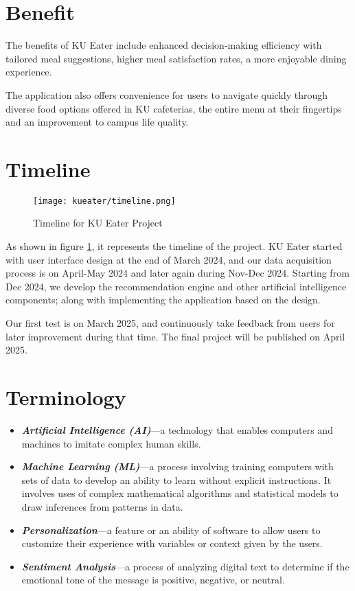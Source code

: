 \newpage

\section{Benefit}
\label{section:benefit}

The benefits of KU Eater include enhanced decision-making efficiency with tailored meal suggestions,
higher meal satisfaction rates, a more enjoyable dining experience.

The application also offers convenience for users to navigate quickly through diverse food options offered in KU cafeterias,
the entire menu at their fingertips and an improvement to campus life quality.

\section{Timeline}
\label{section:timeline}

\begin{figure}[h!]
    \centering
    \texttt{[image: kueater/timeline.png]}
    \caption{Timeline for KU Eater Project}
    \label{fig:timeline}
\end{figure}

As shown in figure \ref{fig:timeline}, it represents the timeline of the project.
KU Eater started with user interface design at the end of March 2024, and our data acquisition process is on April-May 2024 and later again during Nov-Dec 2024.
Starting from Dec 2024, we develop the recommendation engine and other artificial intelligence components;
along with implementing the application based on the design.

Our first test is on March 2025, and continuously take feedback from users for later improvement during that time.
The final project will be published on April 2025.

\section{Terminology}
\label{section:terminology}

\begin{itemize}[leftmargin=40pt]
    \item \textbf{\textit{Artificial Intelligence (AI)}}---a technology that enables computers and machines to imitate complex human skills.
    \item \textbf{\textit{Machine Learning (ML)}}---a process involving training computers with sets of data to develop an ability to learn without explicit instructions. It involves uses of complex mathematical algorithms and statistical models to draw inferences from patterns in data.
    \item \textbf{\textit{Personalization}}---a feature or an ability of software to allow users to customize their experience with variables or context given by the users.
    \item \textbf{\textit{Sentiment Analysis}}---a process of analyzing digital text to determine if the emotional tone of the message is positive, negative, or neutral.
\end{itemize}